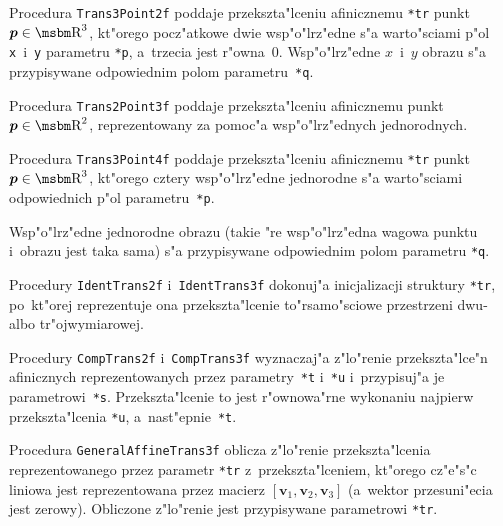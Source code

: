 \vspace{\bigskipamount}
Procedura \texttt{Trans3Point2f} poddaje przekszta"lceniu afinicznemu
\texttt{*tr} punkt $\bm{p}\in\R^3$, kt"orego pocz"atkowe dwie wsp"o"lrz"edne
s"a warto"sciami p"ol \texttt{x}~i~\texttt{y} parametru \texttt{*p},
a~trzecia jest r"owna~$0$.
Wsp"o"lrz"edne $x$~i~$y$ obrazu s"a przypisywane odpowiednim polom
parametru~\texttt{*q}.

\vspace{\bigskipamount}
Procedura \texttt{Trans2Point3f} poddaje przekszta"lceniu afinicznemu
punkt~$\bm{p}\in\R^2$, reprezentowany za pomoc"a wsp"o"lrz"ednych jednorodnych.

\vspace{\bigskipamount}
Procedura \texttt{Trans3Point4f} poddaje przekszta"lceniu afinicznemu
\texttt{*tr} punkt~$\bm{p}\in\R^3$, kt"orego cztery wsp"o"lrz"edne jednorodne
s"a warto"sciami odpowiednich p"ol parametru~\texttt{*p}.

Wsp"o"lrz"edne jednorodne obrazu (takie "re wsp"o"lrz"edna wagowa punktu
i~obrazu jest taka sama) s"a przypisywane odpowiednim polom parametru
\texttt{*q}.

\newpage
{}
Procedury \texttt{IdentTrans2f} i~\texttt{IdentTrans3f} dokonuj"a
inicjalizacji struktury \texttt{*tr}, po~kt"orej reprezentuje ona
przekszta"lcenie to"rsamo"sciowe przestrzeni dwu- albo tr"ojwymiarowej.

\vspace{\bigskipamount}
Procedury \texttt{CompTrans2f} i~\texttt{CompTrans3f} wyznaczaj"a z"lo"renie
przekszta"lce"n afinicznych reprezentowanych przez parametry~\texttt{*t}
i~\texttt{*u} i~przypisuj"a je parametrowi~\texttt{*s}. Przekszta"lcenie to
jest r"ownowa"rne wykonaniu najpierw przekszta"lcenia \texttt{*u},
a~nast"epnie~\texttt{*t}.

\vspace{\bigskipamount}
Procedura \texttt{GeneralAffineTrans3f} oblicza z"lo"renie przekszta"lcenia
reprezentowanego przez parametr \texttt{*tr} z~przekszta"lceniem, kt"orego
cz"e"s"c liniowa jest reprezentowana przez macierz
$[\bm{v}_1,\bm{v}_2,\bm{v}_3]$ (a~wektor przesuni"ecia jest zerowy).
Obliczone z"lo"renie jest przypisywane parametrowi \texttt{*tr}.

